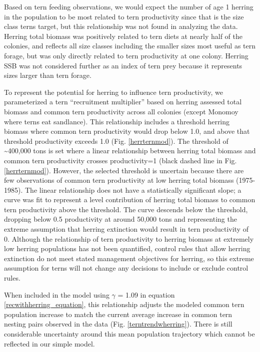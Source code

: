 \documentclass[]{article}
\begin{document}
Based on tern feeding observations, we would expect the number of age 1
herring in the population to be most related to tern productivity since
that is the size class terns target, but this relationship was not found
in analyzing the data. Herring total biomass was positively related to
tern diets at nearly half of the colonies, and reflects all size classes
including the smaller sizes most useful as tern forage, but was only
directly related to tern productivity at one colony. Herring SSB was not
considered further as an index of tern prey because it represents sizes
larger than tern forage.

To represent the potential for herring to influence tern productivity,
we parameterized a tern ``recruitment multiplier'' based on herring
assessed total biomass and common tern productivity across all colonies
(except Monomoy where terns eat sandlance). This relationship includes a
threshold herring biomass where common tern productivity would drop
below 1.0, and above that threshold productivity exceeds 1.0 (Fig.
\ref{herrternmod}). The threshold of \textasciitilde{}400,000 tons is
set where a linear relationship between herring total biomass and common
tern productivity crosses productivity=1 (black dashed line in Fig.
\ref{herrternmod}). However, the selected threshold is uncertain because
there are few observations of common tern productivity at low herring
total biomass (1975-1985). The linear relationship does not have a
statistically significant slope; a curve was fit to represent a level
contribution of herring total biomass to common tern productivity above
the threshold. The curve descends below the threshold, dropping below
0.5 productivity at around 50,000 tons and representing the extreme
assumption that herring extinction would result in tern productivity of
0. Although the relationship of tern productivity to herring biomass at
extremely low herring populations has not been quantified, control rules
that allow herring extinction do not meet stated management objectives
for herring, so this extreme assumption for terns will not change any
decisions to include or exclude control rules.

When included in the model using \(\gamma\) = 1.09 in equation
\ref{recwithherring_equation}, this relationship adjusts the modeled
common tern population increase to match the current average increase in
common tern nesting pairs observed in the data (Fig.
\ref{terntrendwherring}). There is still considerable uncertainty around
this mean population trajectory which cannot be reflected in our simple
model.
\end{document}

